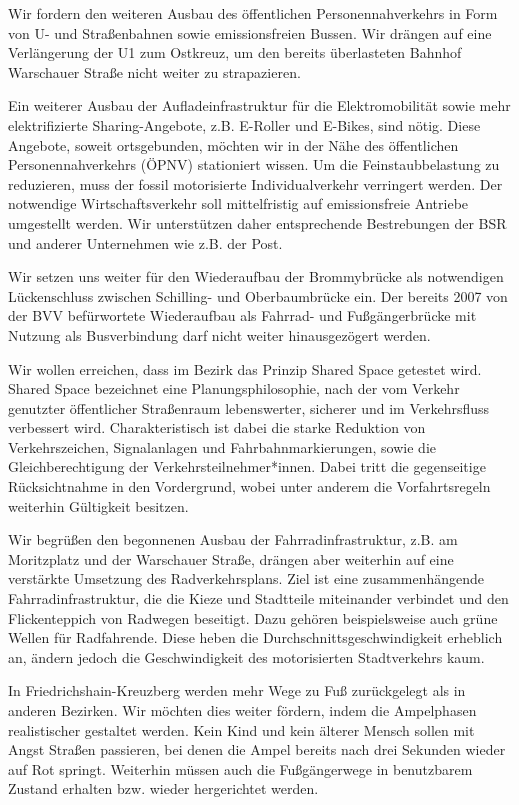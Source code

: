 \documentclass[a4paper,10pt]{article}
\begin{document}
Wir fordern den weiteren Ausbau des öffentlichen Personennahverkehrs in
Form von U- und Straßenbahnen sowie emissionsfreien Bussen. Wir drängen
auf eine Verlängerung der U1 zum Ostkreuz, um den bereits überlasteten
Bahnhof Warschauer Straße nicht weiter zu strapazieren.

Ein weiterer Ausbau der Aufladeinfrastruktur für die Elektromobilität
sowie mehr elektrifizierte Sharing-Angebote, z.B. E-Roller und E-Bikes,
sind nötig. Diese Angebote, soweit ortsgebunden, möchten wir in der Nähe
des öffentlichen Personennahverkehrs (ÖPNV) stationiert wissen. Um die
Feinstaubbelastung zu reduzieren, muss der fossil motorisierte
Individualverkehr verringert werden. Der notwendige Wirtschaftsverkehr
soll mittelfristig auf emissionsfreie Antriebe umgestellt werden. Wir
unterstützen daher entsprechende Bestrebungen der BSR und anderer
Unternehmen wie z.B. der Post.

Wir setzen uns weiter für den Wiederaufbau der Brommybrücke als
notwendigen Lückenschluss zwischen Schilling- und Oberbaumbrücke ein.
Der bereits 2007 von der BVV befürwortete Wiederaufbau als Fahrrad- und
Fußgängerbrücke mit Nutzung als Busverbindung darf nicht weiter
hinausgezögert werden.

Wir wollen erreichen, dass im Bezirk das Prinzip {\glqq}Shared Space{\grqq}
getestet wird. Shared Space bezeichnet eine Planungsphilosophie, nach
der vom Verkehr genutzter öffentlicher Straßenraum lebenswerter,
sicherer und im Verkehrsfluss verbessert wird. Charakteristisch ist
dabei die starke Reduktion von Verkehrszeichen, Signalanlagen und
Fahrbahnmarkierungen, sowie die Gleichberechtigung der
Verkehrsteilnehmer*innen. Dabei tritt die gegenseitige Rücksichtnahme in
den Vordergrund, wobei unter anderem die Vorfahrtsregeln weiterhin
Gültigkeit besitzen.

Wir begrüßen den begonnenen Ausbau der Fahrrad\-infrastruktur, z.B. am
Moritzplatz und der Warschauer Straße, drängen aber weiterhin auf eine
verstärkte Umsetzung des Radverkehrsplans. Ziel ist eine
zusammenhängende Fahrradinfrastruktur, die die Kieze und Stadtteile
miteinander verbindet und den Flickenteppich von Radwegen beseitigt.
Dazu gehören beispielsweise auch grüne Wellen für Radfahrende. Diese
heben die Durchschnittsgeschwindigkeit erheblich an, ändern jedoch die
Geschwindigkeit des motorisierten Stadtverkehrs kaum.


\enlargethispage{2em}
In Friedrichshain-Kreuzberg werden mehr Wege zu Fuß zurückgelegt als in
anderen Bezirken. Wir möchten dies weiter fördern, indem die Ampelphasen
realistischer gestaltet werden. Kein Kind und kein älterer Mensch sollen
mit Angst Straßen passieren, bei denen die Ampel bereits nach drei
Sekunden wieder auf Rot springt. Weiterhin müssen auch die Fußgängerwege
in benutzbarem Zustand erhalten bzw. wieder hergerichtet werden.
\end{document}
